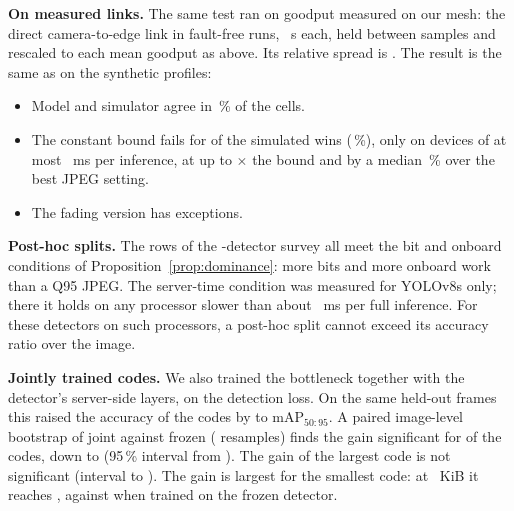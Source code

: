 \textbf{On measured links.} The same test ran on goodput measured on our mesh: the direct camera-to-edge link in
\BeSimRealSeeds{} fault-free runs, \BeSimRealDuration~s each, held between samples and rescaled to each mean goodput
as above. Its relative spread is \BeSimMeshSpread. The result is the same as on the synthetic profiles:
\begin{itemize}
\item Model and simulator agree in \BeSimMeshAgree\,\% of the cells.
\item The constant bound fails for \BeSimMeshExc{} of the \BeSimMeshWins{} simulated wins (\BeSimMeshExcPct\,\%), only on
devices of at most \BeSimRealExcTfullMax~ms per inference, at up to \BeSimMeshRatio$\times$ the bound and by a median
\BeSimMeshMargin\,\% over the best JPEG setting.
\item The fading version has \BeSimMeshFadingExc{} exceptions.
\end{itemize}

\textbf{Post-hoc splits.} The \BeSurveyRows{} rows of the \BeSurveyModels-detector survey all meet the bit and onboard
conditions of Proposition~\ref{prop:dominance}: more bits and more onboard work than a Q95 JPEG. The server-time
condition was measured for YOLOv8s only; there it holds on any processor slower than about \GenDominanceTmin~ms per
full inference. For these detectors on such processors, a post-hoc split cannot exceed its accuracy ratio over the
image.

\textbf{Jointly trained codes.} We also trained the bottleneck together with the detector's server-side layers, on the
detection loss. On the same held-out frames this raised the accuracy of the \BeJointCodes{} codes by \BeJointGainMin{} to
\BeJointGainMax{} mAP$_{50:95}$. A paired image-level bootstrap of joint against frozen (\BeJointPairedBoot{} resamples)
finds the gain significant for \BeJointPairedSig{} of the \BeJointPairedN{} codes, down to \BeJointSigMinGain{}
(95\,\% interval from \BeJointSigMinLo). The \BeJointNsGain{} gain of the largest code is not significant (interval
\BeJointNsLo{} to \BeJointNsHi). The gain is largest for the smallest code: at \BeJointPiCodeKib~KiB it reaches
\BeJointSmallMap{}, against \BeFrozenSmallMap{} when trained on the frozen detector.

